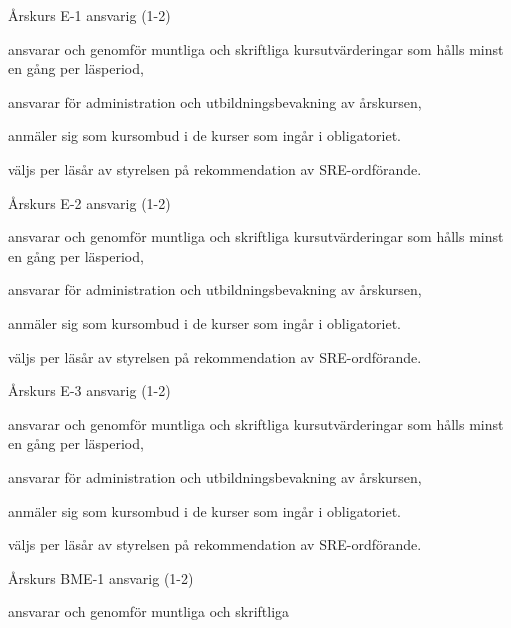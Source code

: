 \documentclass[10pt]{article}
\begin{document}
\begin{emptylist}
    \item Årskurs E-1 ansvarig (1-2)
        \begin{dashlist}
            \item ansvarar och genomför muntliga och skriftliga
                kursutvärderingar som hålls minst en gång per läsperiod,
            \item ansvarar för administration och utbildningsbevakning av
                årskursen,
            \item anmäler sig som kursombud i de kurser som ingår i
                obligatoriet.
            \item väljs per läsår av styrelsen på rekommendation av SRE-ordförande.
        \end{dashlist}
    \item Årskurs E-2 ansvarig (1-2)
        \begin{dashlist}
            \item ansvarar och genomför muntliga och skriftliga
                kursutvärderingar som hålls minst en gång per läsperiod,
            \item ansvarar för administration och utbildningsbevakning av
                årskursen,
            \item anmäler sig som kursombud i de kurser som ingår i
                obligatoriet.
              \item väljs per läsår av styrelsen på rekommendation av SRE-ordförande.
        \end{dashlist}
    \item Årskurs E-3 ansvarig (1-2)
        \begin{dashlist}
            \item ansvarar och genomför muntliga och skriftliga
                kursutvärderingar som hålls minst en gång per läsperiod,
            \item ansvarar för administration och utbildningsbevakning av
                årskursen,
            \item anmäler sig som kursombud i de kurser som ingår i
                obligatoriet.
             \item väljs per läsår av styrelsen på rekommendation av SRE-ordförande.
        \end{dashlist}
    \item Årskurs BME-1 ansvarig (1-2)
        \begin{dashlist}
            \item ansvarar och genomför muntliga och skriftliga

\end{dashlist}
\end{emptylist}
\end{document}

